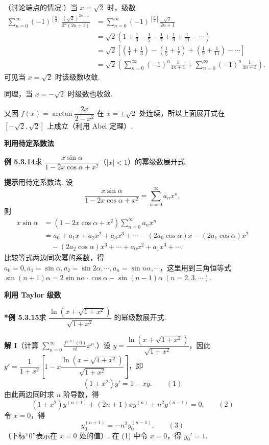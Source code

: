 \documentclass[UTF8, 12pt, fontset=fandol, oneside]{ctexart}
\begin{document}
（讨论端点的情况.）当 $x=\sqrt2$ 时，级数
\[
\begin{aligned}
\sum_{n=0}^{\infty}(-1)^{\left[\frac n2\right]}
\frac{(\sqrt2)^{2n+1}}{2^n(2n+1)}
&=\sum_{n=0}^{\infty}(-1)^{\left[\frac n2\right]}\frac{\sqrt2}{2n+1}\\
&=\sqrt2\left(1+\frac13-\frac15-\frac17+\frac19+\frac1{11}-\cdots\right)\\
&=\sqrt2\left[\left(\frac11+\frac13\right)-\left(\frac15+\frac17\right)
+\left(\frac19+\frac1{11}\right)-\cdots\right]\\
&=\sqrt2\left(\sum_{n=0}^{\infty}(-1)^n\frac1{4n+1}
+\sum_{n=0}^{\infty}(-1)^n\frac1{4n+3}\right).
\end{aligned}
\]
可见当 $x=\sqrt2$ 时该级数收敛.

同理，当 $x=-\sqrt2$ 时级数也收敛.

又因 $f(x)=\arctan\dfrac{2x}{2-x^2}$ 在 $x=\pm\sqrt2$ 处连续，所以上面展开式在
$[-\sqrt2,\sqrt2]$ 上成立（利用 Abel 定理）.

\noindent\textbf{利用待定系数法}

\noindent\textbf{例 5.3.14}\quad 求 $\dfrac{x\sin\alpha}{1-2x\cos\alpha+x^2}$（$|x|<1$）的幂级数展开式.

\noindent\textbf{提示}\quad 用待定系数法. 设
\[
  \frac{x\sin\alpha}{1-2x\cos\alpha+x^2}
  =\sum_{n=0}^{\infty}a_nx^n,
\]
则
\[
\begin{aligned}
x\sin\alpha
&=(1-2x\cos\alpha+x^2)\sum_{n=0}^{\infty}a_nx^n\\
&=a_0+a_1x+a_2x^2+a_3x^3+\cdots
-(2a_0\cos\alpha)x-(2a_1\cos\alpha)x^2\\
&\quad-(2a_2\cos\alpha)x^3+\cdots+a_0x^2+a_1x^3+\cdots.
\end{aligned}
\]
比较等式两边同次幂的系数，得 $a_0=0,a_1=\sin\alpha,a_2=\sin2\alpha,\cdots,a_n=\sin n\alpha,\cdots$，这里用到三角恒等式
$\sin(n+1)\alpha=2\sin n\alpha\cdot\cos\alpha-\sin(n-1)\alpha\ (n=2,3,\cdots)$.

\noindent\textbf{利用 Taylor 级数}

\noindent\textbf{*例 5.3.15}\quad 求 $\dfrac{\ln(x+\sqrt{1+x^2})}{\sqrt{1+x^2}}$ 的幂级数展开式.

\noindent\textbf{解 I}\quad （计算 $\displaystyle\sum_{n=0}^{\infty}\frac{f^{(n)}(0)}{n!}x^n$.）设
$y=\dfrac{\ln(x+\sqrt{1+x^2})}{\sqrt{1+x^2}}$，因此
$y'=\dfrac1{1+x^2}\left[1-x\dfrac{\ln(x+\sqrt{1+x^2})}{\sqrt{1+x^2}}\right]$，即
\[
  (1+x^2)y'=1-xy. \qquad(1)
\]
由此两边同时求 $n$ 阶导数，得
\[
  (1+x^2)y^{(n+1)}+(2n+1)xy^{(n)}+n^2y^{(n-1)}=0. \qquad(2)
\]
令 $x=0$，得
\[
  y_0^{(n+1)}=-n^2y_0^{(n-1)}. \qquad(3)
\]
（下标“0”表示在 $x=0$ 处的值）. 在 (1) 中令 $x=0$，得 $y_0'=1$.
\end{document}
